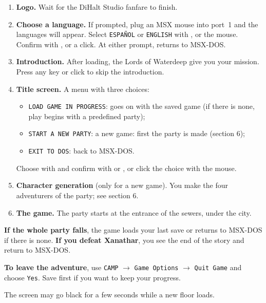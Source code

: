 \begin{enumerate}
\item \textbf{Logo.} Wait for the DiHalt Studio fanfare to finish.
\item \textbf{Choose a language.} If prompted, plug an MSX mouse into port~1 and the languages will appear. Select \texttt{ESPA\~NOL} or \texttt{ENGLISH} with \key{$\leftarrow$}, \key{$\rightarrow$} or the mouse. Confirm with ,  or a click. At either prompt,  returns to MSX-DOS.
\item \textbf{Introduction.} After loading, the Lords of Waterdeep give you your mission. Press any key or click to skip the introduction.
\item \textbf{Title screen.} A menu with three choices:
  \begin{itemize}
  \item \texttt{LOAD GAME IN PROGRESS}: goes on with the saved game (if there is none, play begins with a predefined party);
  \item \texttt{START A NEW PARTY}: a new game: first the party is made (section 6);
  \item \texttt{EXIT TO DOS}: back to MSX-DOS.
  \end{itemize}
  Choose with \key{$\uparrow$} \key{$\downarrow$} and confirm with  or , or click the choice with the mouse.
\item \textbf{Character generation} (only for a new game). You make the four adventurers of the party; see section 6.
\item \textbf{The game.} The party starts at the entrance of the sewers, under the city.
\end{enumerate}

\textbf{If the whole party falls}, the game loads your last save or returns to MSX-DOS if there is none. \textbf{If you defeat Xanathar}, you see the end of the story and return to MSX-DOS.

\textbf{To leave the adventure}, use \texttt{CAMP} $\to$ \texttt{Game Options} $\to$ \texttt{Quit Game} and choose \texttt{Yes}. Save first if you want to keep your progress.

The screen may go black for a few seconds while a new floor loads.
